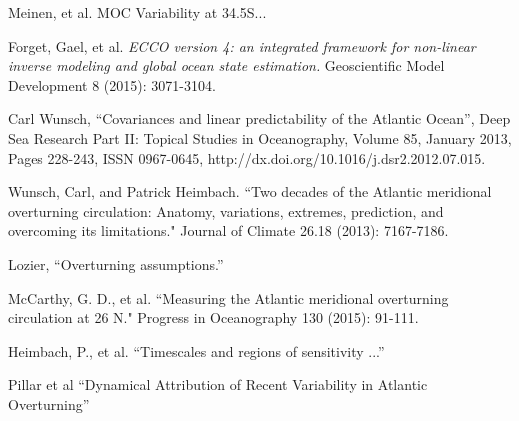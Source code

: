 \documentclass[a4paper,11pt]{article}
\begin{document}
\begin{thebibliography}{3}

  Meinen, et al. MOC Variability at 34.5S...
  
  Forget, Gael, et al. \textit{ECCO version 4: an integrated framework for non-linear inverse modeling and global ocean state estimation.} Geoscientific Model Development 8 (2015): 3071-3104.
  
  Carl Wunsch, ``Covariances and linear predictability of the Atlantic Ocean'', Deep Sea Research Part II: Topical Studies in Oceanography, Volume 85, January 2013, Pages 228-243, ISSN 0967-0645, http://dx.doi.org/10.1016/j.dsr2.2012.07.015.
  
  Wunsch, Carl, and Patrick Heimbach. ``Two decades of the Atlantic meridional overturning circulation: Anatomy, variations, extremes, prediction, and overcoming its limitations." Journal of Climate 26.18 (2013): 7167-7186.
  
  Lozier, ``Overturning assumptions.'' 

  McCarthy, G. D., et al. ``Measuring the Atlantic meridional overturning circulation at 26 N." Progress in Oceanography 130 (2015): 91-111.

  Heimbach, P., et al. ``Timescales and regions of sensitivity ...''

  Pillar et al ``Dynamical Attribution of Recent Variability in Atlantic Overturning''

\end{thebibliography}
\end{document}
